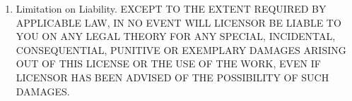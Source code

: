\documentclass{article}
\begin{document}
{\begin{enumerate}
UNLESS OTHERWISE MUTUALLY AGREED TO BY THE PARTIES IN WRITING, LICENSOR OFFERS THE WORK AS-IS AND MAKES NO REPRESENTATIONS OR WARRANTIES OF ANY KIND CONCERNING THE WORK, EXPRESS, IMPLIED, STATUTORY OR OTHERWISE, INCLUDING, WITHOUT LIMITATION, WARRANTIES OF TITLE, MERCHANTIBILITY, FITNESS FOR A PARTICULAR PURPOSE, NONINFRINGEMENT, OR THE ABSENCE OF LATENT OR OTHER DEFECTS, ACCURACY, OR THE PRESENCE OF ABSENCE OF ERRORS, WHETHER OR NOT DISCOVERABLE. SOME JURISDICTIONS DO NOT ALLOW THE EXCLUSION OF IMPLIED WARRANTIES, SO SUCH EXCLUSION MAY NOT APPLY TO YOU.

	\item Limitation on Liability. EXCEPT TO THE EXTENT REQUIRED BY APPLICABLE LAW, IN NO EVENT WILL LICENSOR BE LIABLE TO YOU ON ANY LEGAL THEORY FOR ANY SPECIAL, INCIDENTAL, CONSEQUENTIAL, PUNITIVE OR EXEMPLARY DAMAGES ARISING OUT OF THIS LICENSE OR THE USE OF THE WORK, EVEN IF LICENSOR HAS BEEN ADVISED OF THE POSSIBILITY OF SUCH DAMAGES.


\end{enumerate}}
\end{document}
